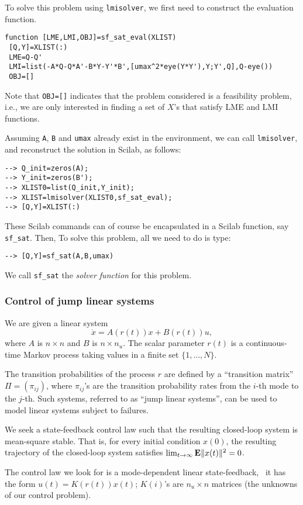 \documentclass{article}
\begin{document}
To solve this problem using {\tt lmisolver},  we first need to construct
the evaluation function.
\begin{verbatim}
function [LME,LMI,OBJ]=sf_sat_eval(XLIST)
 [Q,Y]=XLIST(:)
 LME=Q-Q'
 LMI=list(-A*Q-Q*A'-B*Y-Y'*B',[umax^2*eye(Y*Y'),Y;Y',Q],Q-eye())
 OBJ=[]
\end{verbatim}
Note that {\tt OBJ=[]} indicates that
the problem considered is a feasibility problem, i.e., we are only
interested in finding a set of $X$'s that satisfy LME and LMI functions.


Assuming {\tt A}, {\tt B} and {\tt umax}
already exist in the environment, we can call {\tt lmisolver}, and
reconstruct the solution in Scilab, as follows:
\begin{verbatim}
--> Q_init=zeros(A);
--> Y_init=zeros(B');
--> XLIST0=list(Q_init,Y_init);
--> XLIST=lmisolver(XLIST0,sf_sat_eval);
--> [Q,Y]=XLIST(:)
\end{verbatim}
These Scilab commands can of course be encapsulated in
a Scilab function, say {\tt sf{\_}sat}. Then, To solve this problem,
all we need to do is type:
\begin{verbatim}
--> [Q,Y]=sf_sat(A,B,umax) 
\end{verbatim}
We call {\tt sf{\_}sat} the {\em solver function} for this problem.



\subsubsection{Control of jump linear systems}
\label{ex2}
We are given a linear system 
\[
\dot{x} = A(r(t))x+B(r(t))u,
\]
where $A$ is $n \times n$ and $B$ is $n \times n_u$.   The scalar
parameter $r(t)$ is a continuous-time Markov process taking values in
a finite set $\{1,\ldots,N\}$. 

The transition probabilities of the process $r$ are defined by a
``transition matrix'' $\Pi = (\pi_{ij})$, where $\pi_{ij}$'s are the 
transition probability rates from
the $i$-th mode to the $j$-th.  Such systems, referred to as ``jump
linear systems'', can be used to model linear systems subject to
failures.

We seek a state-feedback control law such that the resulting
closed-loop system is mean-square stable.  That is, for every initial
condition $x(0)$, the resulting trajectory of the closed-loop system
satisfies $\lim_{t \rightarrow \infty} \mbox{\bf E} \| x(t) \| ^2 = 0$.

The control law we look for is a mode-dependent linear state-feedback,
\ie\ it has the form $u(t) = K(r(t))x(t)$; $K(i)$'s are $n_u \times n$ matrices (the
unknowns of our control problem). 
\end{document}
